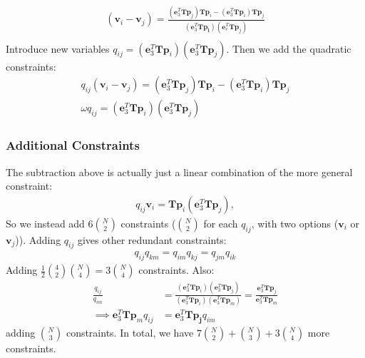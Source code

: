 \documentclass{article}
\newcommand{\mbf}[1]{\mathbf{#1}}
\begin{document}
\begin{align}
    (\mbf{v}_i - \mbf{v}_j) = \frac{(\mbf{e}_3^T \mbf{T} \mbf{p}_j) \mbf{T} \mbf{p}_i - (\mbf{e}_3^T \mbf{T} \mbf{p}_i) \mbf{T} \mbf{p}_j}{(\mbf{e}_3 ^T \mbf{T} \mbf{p_i})(\mbf{e}_e^T \mbf{T} \mbf{p}_j)} \\
\end{align}
Introduce new variables $q_{ij} = (\mbf{e}_3^T \mbf{T} \mbf{p}_i) (\mbf{e}_3^T \mbf{T} \mbf{p}_j)$.
Then we add the quadratic constraints:
\begin{align}
    q_{ij} (\mbf{v}_i - \mbf{v}_j) = (\mbf{e}_3^T \mbf{T} \mbf{p}_j) \mbf{T} \mbf{p}_i - (\mbf{e}_3^T \mbf{T} \mbf{p}_i) \mbf{T} \mbf{p}_j \\
    \omega q_{ij} = (\mbf{e}_3^T \mbf{T} \mbf{p}_i) (\mbf{e}_3^T \mbf{T} \mbf{p}_j)
\end{align}

\subsubsection{Additional Constraints}

The subtraction above is actually just a linear combination of the more general constraint:
\begin{align}
    q_{ij} \mbf{v}_i = \mbf{T} \mbf{p}_i (\mbf{e}_3^T \mbf{T} \mbf{p}_j),
\end{align}
So we instead add $6{N \choose 2}$ constraints ($N \choose 2$ for each $q_{ij}$, with two options ($\mbf{v}_i$ or $\mbf{v}_j$)).
Adding $q_{ij}$ gives other redundant constraints:
\begin{align}
    q_{ij} q_{km} = q_{im} q_{kj} = q_{jm} q_{ik}
\end{align}
Adding $\frac{1}{2} {4 \choose 2} {N \choose 4} = 3 {N \choose 4}$ constraints. Also:
\begin{align}
    \frac{q_{ij}}{q_{im}} &= \frac{(\mbf{e}_3^T \mbf{T} \mbf{p}_i)(\mbf{e}_3^T \mbf{T} \mbf{p}_j)}{(\mbf{e}_3^T\mbf{T} \mbf{p}_i)(\mbf{e}_3^T \mbf{T} \mbf{p}_m)}
    = \frac{\mbf{e}_3^T \mbf{T} \mbf{p}_j}{\mbf{e}_3^T \mbf{T} \mbf{p}_m} \\
    \implies \mbf{e}_3^T \mbf{T} \mbf{p}_m q_{ij} &= \mbf{e}_3^T \mbf{T} \mbf{p_j} q_{im}
\end{align}
adding ${N \choose 3}$ constraints.
In total, we have $7{N \choose 2} + {N \choose 3} + 3 {N \choose 4}$ more constraints.
\end{document}
